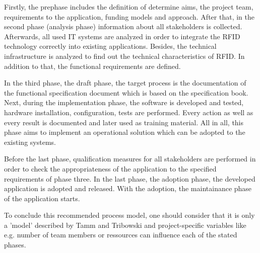 Firstly, the prephase includes the definition of determine aims, the project team, requirements to the application, funding models and approach. After that, in the second phase (analysis phase) information about all stakeholders is collected. Afterwards, all used IT systems are analyzed in order to integrate the RFID technology correctly into existing applications. Besides, the technical infrastructure is analyzed to find out the technical characteristics of RFID. In addition to that, the functional requirements are defined.

In the third phase, the draft phase, the target process is the documentation of the functional specification document which is based on the specification book. Next, during the implementation phase, the software is developed and tested, hardware installation, configuration, tests are performed. Every action as well as every result is documented and later used as training material. All in all, this phase aims to implement an operational solution which can be adopted to the existing systems. 

Before the last phase, qualification measures for all stakeholders are performed in order to check the appropriateness of the application to the specified requirements of phase three.
In the last phase, the adoption phase, the developed application is adopted and released. With the adoption, the maintainance phase of the application starts.

To conclude this recommended process model, one should consider that it is only a 'model' described by Tamm and Tribowski \cite[p.59 ff.]{fokus}and project-specific variables like e.g. number of team members or ressources can influence each of the stated phases.